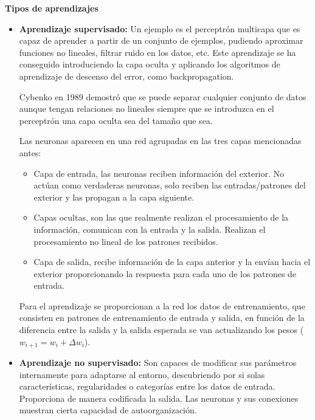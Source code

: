 \documentclass[12pt, twoside, openright]{report} %
\begin{document}
\textbf{Tipos de aprendizajes}
\begin{itemize}
	\item \textbf{Aprendizaje supervisado:} Un ejemplo es el perceptrón multicapa que es capaz de aprender a partir de un conjunto de ejemplos, pudiendo aproximar funciones no lineales, filtrar ruido en los datos, etc. Este aprendizaje se ha conseguido introduciendo la capa oculta y aplicando los algoritmos de aprendizaje de descenso del error, como backpropagation.

	      Cybenko en 1989 demostró que se puede separar cualquier conjunto de datos aunque tengan relaciones no lineales siempre que se introduzca en el perceptrón una capa oculta sea del tamaño que sea.

	      Las neuronas aparecen en una red agrupadas en las tres capas mencionadas antes:
	      \begin{itemize}
		      \item Capa de entrada, las neuronas reciben información del exterior. No actúan como verdaderas neuronas, solo reciben las entradas/patrones del exterior y las propagan a la capa siguiente.
		      \item Capas ocultas, son las que realmente realizan el procesamiento de la información, comunican con la entrada y la salida. Realizan el procesamiento no lineal de los patrones recibidos.
		      \item Capa de salida, recibe información de la capa anterior y la envían hacia el exterior proporcionando la respuesta para cada uno de los patrones de entrada.
	      \end{itemize}

	      Para el aprendizaje se proporcionan a la red los datos de entrenamiento, que consisten en patrones de entrenamiento de entrada y salida, en función de la diferencia entre la salida y la salida esperada se van actualizando los pesos ($w_{i+1}=w_i+\Delta w_i$).
	\item \textbf{Aprendizaje no supervisado:} Son capaces de modificar sus parámetros internamente para adaptarse al entorno, descubriendo por si solas características, regularidades o categorías entre los datos de entrada. Proporciona de manera codificada la salida. Las neuronas y sus conexiones muestran cierta capacidad de autoorganización.
\end{itemize}
\end{document}
